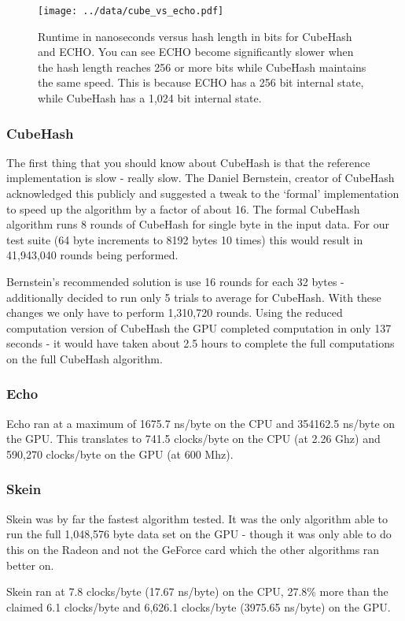 \begin{figure}[htp]
\texttt{[image: ../data/cube\_vs\_echo.pdf]}
\caption{Runtime in nanoseconds versus hash length in bits for CubeHash and ECHO.  You can see ECHO become significantly slower when the hash length reaches 256 or more bits while CubeHash maintains the same speed.  This is because ECHO has a 256 bit internal state, while CubeHash has a 1,024 bit internal state.}\label{fig:cube_vs_echo}
\end{figure}

\subsubsection*{CubeHash}
The first thing that you should know about CubeHash is that the reference implementation is  slow - really slow.
The Daniel Bernstein, creator of CubeHash acknowledged this publicly\cite{Bernstein} and suggested a tweak to the `formal' implementation to speed up the algorithm by a factor of about 16.
The formal CubeHash algorithm runs 8 rounds of CubeHash for single byte in the input data. For our test suite (64 byte increments to 8192 bytes 10 times) this would result in 41,943,040 rounds being performed.

Bernstein's recommended solution is use 16 rounds for each 32 bytes - additionally decided to run only 5 trials to average for CubeHash.
With these changes we only have to perform 1,310,720 rounds.
Using the reduced computation version of CubeHash the GPU completed computation in only 137 seconds - it would have taken about 2.5 hours to complete the full computations on the full CubeHash algorithm.

\subsubsection*{Echo}
Echo ran at a maximum of 1675.7 ns/byte on the CPU and 354162.5 ns/byte on the GPU.
This translates to 741.5 clocks/byte on the CPU (at 2.26 Ghz) and 590,270 clocks/byte on the GPU (at 600 Mhz).

\subsubsection*{Skein}
Skein was by far the fastest algorithm tested.
It was the only algorithm able to run the full 1,048,576 byte data set on the GPU - though it was only able to do this on the Radeon and not the GeForce card which the other algorithms ran better on.

Skein ran at 7.8 clocks/byte (17.67 ns/byte) on the CPU, 27.8\% more than the claimed 6.1 clocks/byte and 6,626.1 clocks/byte (3975.65 ns/byte) on the GPU.